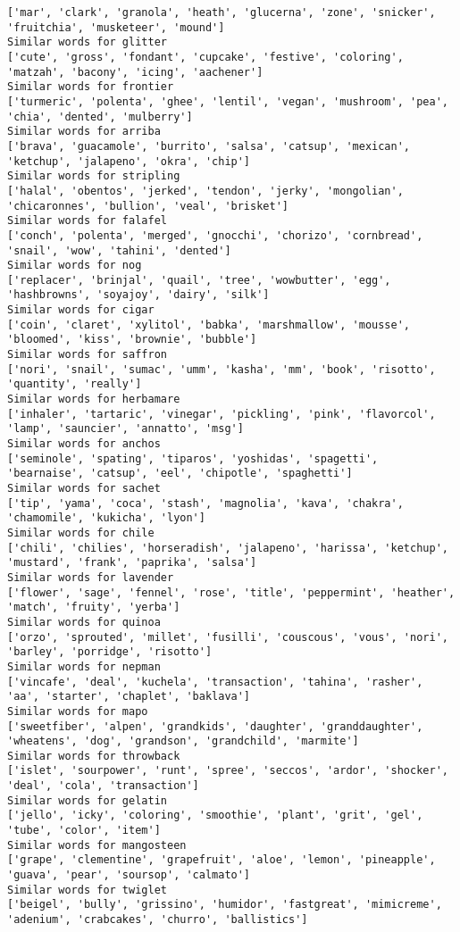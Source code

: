 \documentclass[11pt]{article}
\begin{document}
\begin{Verbatim}[commandchars=\\\{\}]
['mar', 'clark', 'granola', 'heath', 'glucerna', 'zone', 'snicker', 'fruitchia', 'musketeer', 'mound']
Similar words for glitter
['cute', 'gross', 'fondant', 'cupcake', 'festive', 'coloring', 'matzah', 'bacony', 'icing', 'aachener']
Similar words for frontier
['turmeric', 'polenta', 'ghee', 'lentil', 'vegan', 'mushroom', 'pea', 'chia', 'dented', 'mulberry']
Similar words for arriba
['brava', 'guacamole', 'burrito', 'salsa', 'catsup', 'mexican', 'ketchup', 'jalapeno', 'okra', 'chip']
Similar words for stripling
['halal', 'obentos', 'jerked', 'tendon', 'jerky', 'mongolian', 'chicaronnes', 'bullion', 'veal', 'brisket']
Similar words for falafel
['conch', 'polenta', 'merged', 'gnocchi', 'chorizo', 'cornbread', 'snail', 'wow', 'tahini', 'dented']
Similar words for nog
['replacer', 'brinjal', 'quail', 'tree', 'wowbutter', 'egg', 'hashbrowns', 'soyajoy', 'dairy', 'silk']
Similar words for cigar
['coin', 'claret', 'xylitol', 'babka', 'marshmallow', 'mousse', 'bloomed', 'kiss', 'brownie', 'bubble']
Similar words for saffron
['nori', 'snail', 'sumac', 'umm', 'kasha', 'mm', 'book', 'risotto', 'quantity', 'really']
Similar words for herbamare
['inhaler', 'tartaric', 'vinegar', 'pickling', 'pink', 'flavorcol', 'lamp', 'sauncier', 'annatto', 'msg']
Similar words for anchos
['seminole', 'spating', 'tiparos', 'yoshidas', 'spagetti', 'bearnaise', 'catsup', 'eel', 'chipotle', 'spaghetti']
Similar words for sachet
['tip', 'yama', 'coca', 'stash', 'magnolia', 'kava', 'chakra', 'chamomile', 'kukicha', 'lyon']
Similar words for chile
['chili', 'chilies', 'horseradish', 'jalapeno', 'harissa', 'ketchup', 'mustard', 'frank', 'paprika', 'salsa']
Similar words for lavender
['flower', 'sage', 'fennel', 'rose', 'title', 'peppermint', 'heather', 'match', 'fruity', 'yerba']
Similar words for quinoa
['orzo', 'sprouted', 'millet', 'fusilli', 'couscous', 'vous', 'nori', 'barley', 'porridge', 'risotto']
Similar words for nepman
['vincafe', 'deal', 'kuchela', 'transaction', 'tahina', 'rasher', 'aa', 'starter', 'chaplet', 'baklava']
Similar words for mapo
['sweetfiber', 'alpen', 'grandkids', 'daughter', 'granddaughter', 'wheatens', 'dog', 'grandson', 'grandchild', 'marmite']
Similar words for throwback
['islet', 'sourpower', 'runt', 'spree', 'seccos', 'ardor', 'shocker', 'deal', 'cola', 'transaction']
Similar words for gelatin
['jello', 'icky', 'coloring', 'smoothie', 'plant', 'grit', 'gel', 'tube', 'color', 'item']
Similar words for mangosteen
['grape', 'clementine', 'grapefruit', 'aloe', 'lemon', 'pineapple', 'guava', 'pear', 'soursop', 'calmato']
Similar words for twiglet
['beigel', 'bully', 'grissino', 'humidor', 'fastgreat', 'mimicreme', 'adenium', 'crabcakes', 'churro', 'ballistics']

\end{Verbatim}
\end{document}
